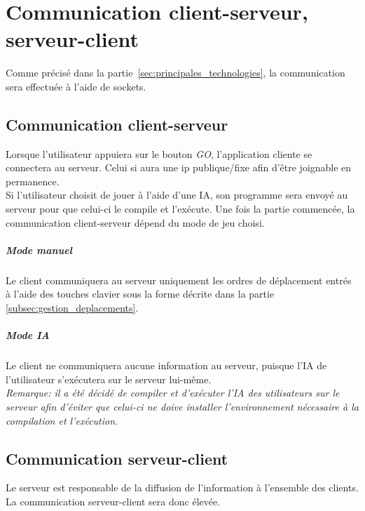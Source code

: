 \chapter{Communication client-serveur, serveur-client}
    Comme précisé dans la partie~\ref{sec:principales_technologies}, la communication sera effectuée à l'aide de sockets.


    \section{Communication client-serveur}
        Lorsque l'utilisateur appuiera sur le bouton \emph{GO}, l'application cliente se connectera au serveur. Celui si aura une ip publique/fixe afin d'être joignable en permanence.\\

        Si l'utilisateur choisit de jouer à l'aide d'une IA, son programme sera envoyé au serveur pour que celui-ci le compile et l'exécute. Une fois la partie commencée, la communication client-serveur dépend du mode de jeu choisi.

        \paragraph{Mode manuel} Le client communiquera au serveur uniquement les ordres de déplacement entrés à l'aide des touches clavier sous la forme décrite dans la partie \ref{subsec:gestion_deplacements}.

        \paragraph{Mode IA} Le client ne communiquera aucune information au serveur, puisque l'IA de l'utilisateur s'exécutera sur le serveur lui-même. \\

        \emph{Remarque: il a été décidé de compiler et d'exécuter l'IA des utilisateurs sur le serveur afin d'éviter que celui-ci ne doive installer l'environnement nécessaire à la compilation et l'exécution.}


    \section{Communication serveur-client}
        Le serveur est responsable de la diffusion de l'information à l'ensemble des clients. La communication serveur-client sera donc élevée. \\

